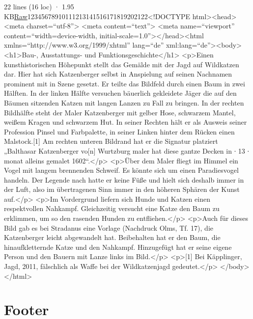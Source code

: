\documentclass[
  letterpaper,
]{book}
\begin{document}
22 lines (16 loc) · 1.95
KB\href{https://github.com/shionkim/CPS-Demo/raw/main/text/wildkatzenjagd.html}{Raw}12345678910111213141516171819202122\textless!DOCTYPE
html\textgreater\textless head\textgreater{} \textless meta
charset=``utf-8''\textgreater{} \textless meta
content=``text''\textgreater{} \textless meta name=``viewport''
content=``width=device-width,
initial-scale=1.0''\textgreater\textless/head\textgreater\textless html
xmlns=``http://www.w3.org/1999/xhtml'' lang=``de''
xml:lang=``de''\textgreater\textless body\textgreater{}
\textless h1\textgreater Bau-, Ausstattungs- und
Funktionsgeschichte\textless/h1\textgreater{}
\textless p\textgreater Einen kunsthistorischen Höhepunkt stellt das
Gemälde mit der Jagd auf Wildkatzen dar. Hier hat sich Katzenberger
selbst in Anspielung auf seinen Nachnamen prominent mit in Szene
gesetzt. Er teilte das Bildfeld durch einen Baum in zwei Hälften. In der
linken Hälfte versuchen bäuerlich gekleidete Jäger die auf den Bäumen
sitzenden Katzen mit langen Lanzen zu Fall zu bringen. In der rechten
Bildhälfte steht der Maler Katzenberger mit gelber Hose, schwarzem
Mantel, weißem Kragen und schwarzem Hut. In seiner Rechten hält er als
Ausweis seiner Profession Pinsel und Farbpalette, in seiner Linken
hinter dem Rücken einen Malstock.{[}1{]} Am rechten unteren Bildrand hat
er die Signatur platziert „Balthasar Katzenberger vo{[}n{]} Wurtzburg
maler hat diese gantze Decken in ∙ 13 ∙ monat alleins gemalet
1602``.\textless/p\textgreater{} \textless p\textgreater Über dem Maler
fliegt im Himmel ein Vogel mit langem brennenden Schweif. Es könnte sich
um einen Paradiesvogel handeln. Der Legende nach hatte er keine Füße und
hielt sich deshalb immer in der Luft, also im übertragenen Sinn immer in
den höheren Sphären der Kunst auf.\textless/p\textgreater{}
\textless p\textgreater Im Vordergrund liefern sich Hunde und Katzen
einen respektvollen Nahkampf. Gleichzeitig versucht eine Katze den Baum
zu erklimmen, um so den rasenden Hunden zu
entfliehen.\textless/p\textgreater{} \textless p\textgreater Auch für
dieses Bild gab es bei Stradanus eine Vorlage (Nachdruck Olms, Tf. 17),
die Katzenberger leicht abgewandelt hat. Beibehalten hat er den Baum,
die hinaufkletternde Katze und den Nahkampf. Hinzugefügt hat er seine
eigene Person und den Bauern mit Lanze links im
Bild.\textless/p\textgreater{} \textless p\textgreater{[}1{]} Bei
Käpplinger, Jagd, 2011, fälschlich als Waffe bei der Wildkatzenjagd
gedeutet.\textless/p\textgreater{}
\textless/body\textgreater\textless/html\textgreater{}

\section{Footer}\label{footer-1}
\end{document}
